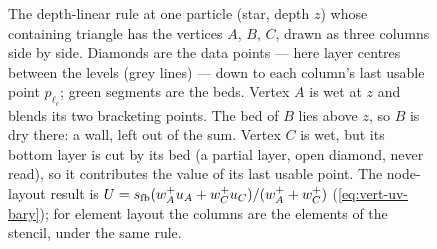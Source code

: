 \begin{figure}[t]
\caption{The depth-linear rule at one particle (star, depth $z$) whose containing triangle has the
vertices $A$, $B$, $C$, drawn as three columns side by side. Diamonds are the data points --- here layer
centres between the levels (grey lines) --- down to each column's last usable point $p_{\ell_c}$; green
segments are the beds. Vertex $A$ is wet at $z$ and blends its two bracketing points. The bed of $B$ lies
above $z$, so $B$ is dry there: a wall, left out of the sum. Vertex $C$ is wet, but its bottom layer is cut
by its bed (a partial layer, open diamond, never read), so it contributes the value of its last usable
point. The node-layout result is $U=s_{\mathrm{fb}}(w_A^{+}u_A+w_C^{+}u_C)/(w_A^{+}+w_C^{+})$
(\cref{eq:vert-uv-bary}); for element layout the columns are the elements of the stencil, under the same
rule.}
\label{fig:vert-uv}
\end{figure}

